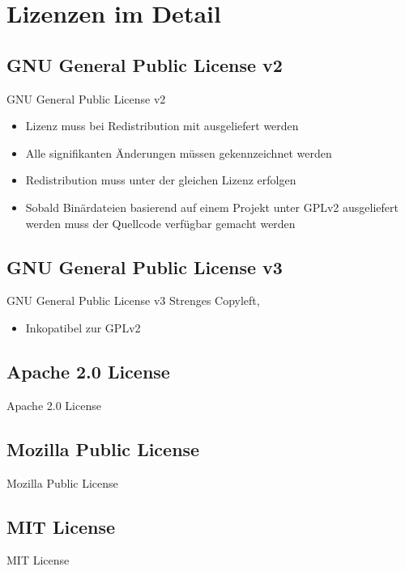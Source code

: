 \documentclass{beamer}
\begin{document}
\section{Lizenzen im Detail}
\subsection{GNU General Public License v2}
\begin{frame}{GNU General Public License v2}
	\begin{itemize}
		\item Lizenz muss bei Redistribution mit ausgeliefert werden
		\item Alle signifikanten Änderungen müssen gekennzeichnet werden
		\item Redistribution muss unter der gleichen Lizenz erfolgen
		\item Sobald Binärdateien basierend auf einem Projekt unter GPLv2
			ausgeliefert werden muss der Quellcode verfügbar gemacht werden
	\end{itemize}
\end{frame}

\subsection{GNU General Public License v3}
\begin{frame}{GNU General Public License v3}
	Strenges Copyleft,
	\begin{itemize}
		\item Inkopatibel zur GPLv2
	\end{itemize}
\end{frame}

\subsection{Apache 2.0 License}
\begin{frame}{Apache 2.0 License}
\end{frame}

\subsection{Mozilla Public License}
\begin{frame}{Mozilla Public License}
\end{frame}

\subsection{MIT License}
\begin{frame}{MIT License}
\end{frame}
\end{document}
